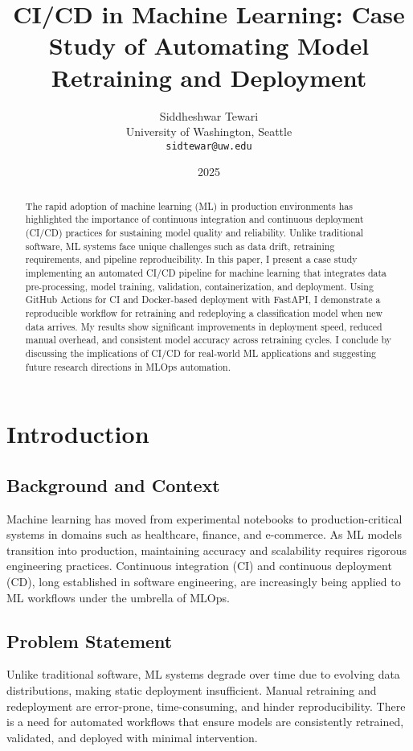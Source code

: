 \documentclass[11pt]{article}
\title{CI/CD in Machine Learning: Case Study of Automating Model Retraining and Deployment}
\author{Siddheshwar Tewari \\
University of Washington, Seattle \\
\texttt{sidtewar@uw.edu}}
\date{2025}
\begin{document}
\maketitle

\begin{abstract}
The rapid adoption of machine learning (ML) in production environments has highlighted the importance of continuous integration and continuous deployment (CI/CD) practices for sustaining model quality and reliability. Unlike traditional software, ML systems face unique challenges such as data drift, retraining requirements, and pipeline reproducibility. In this paper, I present a case study implementing an automated CI/CD pipeline for machine learning that integrates data pre-processing, model training, validation, containerization, and deployment. Using GitHub Actions for CI and Docker-based deployment with FastAPI, I demonstrate a reproducible workflow for retraining and redeploying a classification model when new data arrives. My results show significant improvements in deployment speed, reduced manual overhead, and consistent model accuracy across retraining cycles. I conclude by discussing the implications of CI/CD for real-world ML applications and suggesting future research directions in MLOps automation.
\end{abstract}

\section{Introduction}
\subsection{Background and Context}
Machine learning has moved from experimental notebooks to production-critical systems in domains such as healthcare, finance, and e-commerce. As ML models transition into production, maintaining accuracy and scalability requires rigorous engineering practices. Continuous integration (CI) and continuous deployment (CD), long established in software engineering, are increasingly being applied to ML workflows under the umbrella of MLOps.

\subsection{Problem Statement}
Unlike traditional software, ML systems degrade over time due to evolving data distributions, making static deployment insufficient. Manual retraining and redeployment are error-prone, time-consuming, and hinder reproducibility. There is a need for automated workflows that ensure models are consistently retrained, validated, and deployed with minimal intervention.
\end{document}
